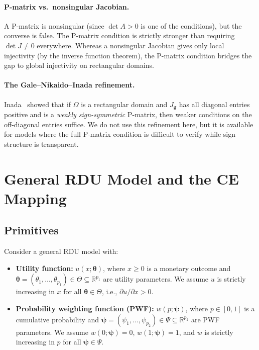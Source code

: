 \documentclass[11pt,a4paper]{article}
\theoremstyle{definition}
\newcommand{\R}{\mathbb{R}}
\newcommand{\btheta}{\boldsymbol{\theta}}
\newcommand{\bpsi}{\boldsymbol{\psi}}
\begin{document}
\paragraph{P-matrix vs.\ nonsingular Jacobian.}
A P-matrix is nonsingular (since $\det A > 0$ is one of the conditions), but
the converse is false. The P-matrix condition is strictly stronger than
requiring $\det J \neq 0$ everywhere. Whereas a nonsingular Jacobian gives
only local injectivity (by the inverse function theorem), the P-matrix condition
bridges the gap to global injectivity on rectangular domains.

\paragraph{The Gale--Nikaido--Inada refinement.}
Inada~\cite{gale_nikaido_1965} showed that if $\Omega$ is a rectangular domain
and $J_{\mathbf{g}}$ has all diagonal entries positive and is a \emph{weakly
sign-symmetric} P-matrix, then weaker conditions on the off-diagonal entries
suffice. We do not use this refinement here, but it is available for models
where the full P-matrix condition is difficult to verify while sign structure
is transparent.


\section{General RDU Model and the CE Mapping}
\label{sec:model}

\subsection{Primitives}

Consider a general RDU model with:
\begin{itemize}
    \item \textbf{Utility function:} $u(x; \btheta)$, where $x \geq 0$ is a
    monetary outcome and $\btheta = (\theta_1, \ldots, \theta_{p_1}) \in
    \Theta \subseteq \R^{p_1}$ are utility parameters. We assume $u$ is
    strictly increasing in $x$ for all $\btheta \in \Theta$, i.e.,
    $\partial u / \partial x > 0$.

    \item \textbf{Probability weighting function (PWF):}
    $w(p; \bpsi)$, where $p \in [0,1]$ is a cumulative probability and
    $\bpsi = (\psi_1, \ldots, \psi_{p_2}) \in \Psi \subseteq \R^{p_2}$ are
    PWF parameters. We assume $w(0;\bpsi) = 0$, $w(1;\bpsi) = 1$, and $w$ is
    strictly increasing in $p$ for all $\bpsi \in \Psi$.
\end{itemize}
\end{document}
